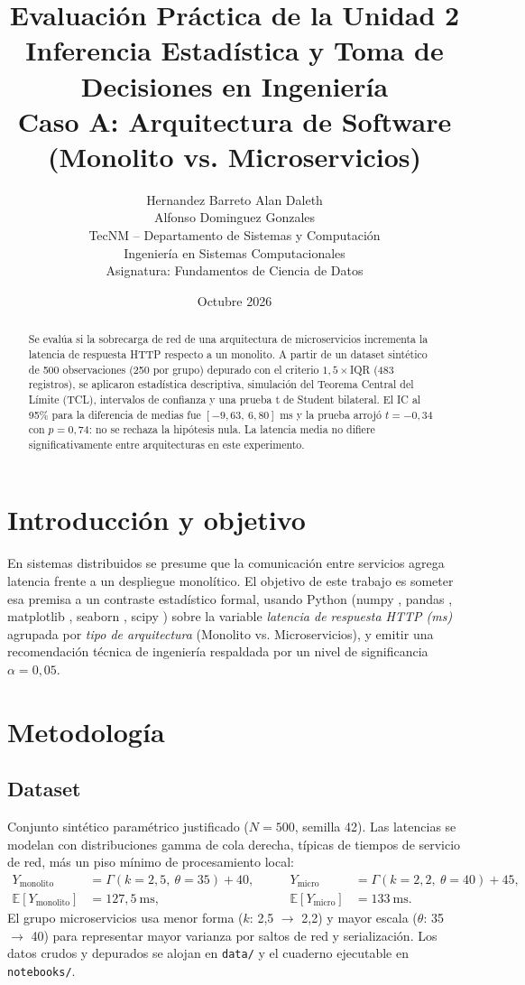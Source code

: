 \documentclass[12pt,a4paper]{article}
\title{\textbf{Evaluación Práctica de la Unidad 2}\\[4pt]
\large Inferencia Estadística y Toma de Decisiones en Ingeniería\\[2pt]
\normalsize Caso A: Arquitectura de Software (Monolito vs. Microservicios)}
\author{Hernandez Barreto Alan Daleth \\ Alfonso Dominguez Gonzales\\[6pt]
TecNM -- Departamento de Sistemas y Computación\\
Ingeniería en Sistemas Computacionales\\
Asignatura: Fundamentos de Ciencia de Datos}
\date{Octubre 2026}
\begin{document}
\maketitle
\thispagestyle{empty}

\begin{abstract}
Se evalúa si la sobrecarga de red de una arquitectura de microservicios incrementa la latencia de respuesta HTTP respecto a un monolito. A partir de un dataset sintético de 500 observaciones (250 por grupo) depurado con el criterio $1{,}5\times$IQR (483 registros), se aplicaron estadística descriptiva, simulación del Teorema Central del Límite (TCL), intervalos de confianza y una prueba t de Student bilateral. El IC al 95\% para la diferencia de medias fue $[-9{,}63,\ 6{,}80]$ ms y la prueba arrojó $t=-0{,}34$ con $p=0{,}74$: no se rechaza la hipótesis nula. La latencia media no difiere significativamente entre arquitecturas en este experimento.
\end{abstract}

\section{Introducción y objetivo}
En sistemas distribuidos se presume que la comunicación entre servicios agrega latencia frente a un despliegue monolítico. El objetivo de este trabajo es someter esa premisa a un contraste estadístico formal, usando Python (numpy \cite{harris2020numpy}, pandas \cite{mckinney2010pandas}, matplotlib \cite{hunter2007matplotlib}, seaborn \cite{waskom2021seaborn}, scipy \cite{virtanen2020scipy}) sobre la variable \emph{latencia de respuesta HTTP (ms)} agrupada por \emph{tipo de arquitectura} (Monolito vs. Microservicios), y emitir una recomendación técnica de ingeniería respaldada por un nivel de significancia $\alpha = 0{,}05$.

\section{Metodología}
\subsection{Dataset}
Conjunto sintético paramétrico justificado ($N = 500$, semilla 42). Las latencias se modelan con distribuciones gamma de cola derecha, típicas de tiempos de servicio de red, más un piso mínimo de procesamiento local:
\begin{align*}
Y_{\text{monolito}} &= \Gamma(k=2{,}5,\ \theta=35) + 40, &\qquad Y_{\text{micro}} &= \Gamma(k=2{,}2,\ \theta=40) + 45,\\
\mathbb{E}[Y_{\text{monolito}}] &= 127{,}5\ \text{ms}, &\qquad \mathbb{E}[Y_{\text{micro}}] &= 133\ \text{ms}.
\end{align*}
El grupo microservicios usa menor forma ($k$: 2,5 $\rightarrow$ 2,2) y mayor escala ($\theta$: 35 $\rightarrow$ 40) para representar mayor varianza por saltos de red y serialización. Los datos crudos y depurados se alojan en \texttt{data/} y el cuaderno ejecutable en \texttt{notebooks/}.
\end{document}
